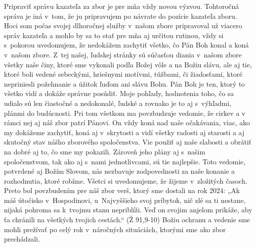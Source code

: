 \def\velkostpisma{10}
\def\velkostriadku{12.5}




Pripraviť správu kazateľa za zbor je pre mňa vždy novou výzvou. Tohtoročná správa je iná v~tom, že ju pripravujem po návrate do pozície kazateľa zboru. Hoci som počas svojej dlhoročnej služby v~našom zbore pripravoval už viacero správ kazateľa a mohlo by sa to stať pre mňa aj určitou rutinou, vždy si s~pokorou uvedomujem, že nedokážem zachytiť všetko, čo Pán Boh konal a koná v~našom zbore. Z~tej našej, ľudskej stránky sú súčasťou diania v~našom zbore všetky naše činy, ktoré sme vykonali podľa Božej vôle a na Božiu slávu, ale aj tie, ktoré boli vedené sebeckými, hriešnymi motívmi, túžbami, či žiadosťami, ktoré nepriniesli požehnanie a úžitok ľuďom ani slávu Bohu. Pán Boh je ten, ktorý to všetko vidí a dokáže správne posúdiť. Moje pohľady, hodnotenia toho, čo sa udialo sú len čiastočné a nedokonalé, ľudské a rovnako je to aj s~výhľadmi, plánmi do budúcnosti. Pri tom všetkom ma povzbudzuje vedomie, že cirkev a v rámci nej aj náš zbor patrí Pánovi.
On vždy koná nad naše očakávania, viac, ako my dokážeme zachytiť, koná aj v~skrytosti a vidí všetky radosti aj starosti a aj skutočný stav nášho zborového spoločenstva. Vie použiť aj naše slabosti a obrátiť na dobré aj to, čo sme my pokazili. Zároveň jeho plány aj s~našim spoločenstvom, tak ako aj s~nami jednotlivcami, sú tie najlepšie. Toto vedomie, potvrdené aj Božím Slovom, nás nezbavuje zodpovednosti za naše konanie a rozhodnutia, ktoré robíme. Všetci si uvedomujeme, že žijeme v~zložitých časoch. Preto bol povzbudením pre náš zbor verš, ktorý sme dostali na rok 2024: „Ak máš útočisko v~Hospodinovi, u~Najvyššieho svoj príbytok, nič zlé sa ti nestane, nijaká pohroma sa k~tvojmu stanu nepriblíži. Veď on svojim anjelom prikáže, aby ťa chránili na všetkých tvojich cestách.“ (Ž 91,9-10) Božiu ochranu a vedenie sme mohli prežívať po celý rok v~náročných situáciách, ktorými sme ako zbor prechádzali.


